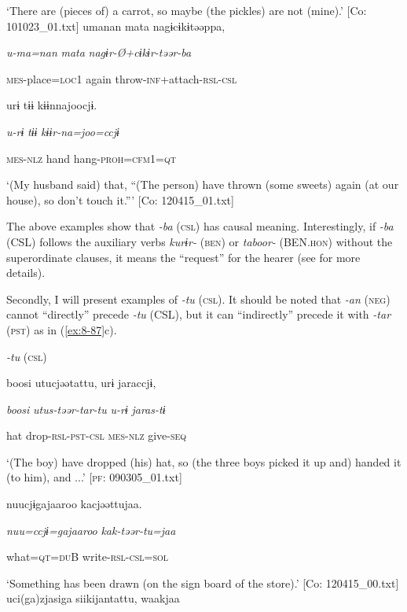 \glt ‘There are (pieces of) a carrot, so maybe (the pickles) are not (mine).’ [Co: 101023\_01.txt]
\ex {\TM}
\glll  umanan  mata  nagɨcɨkɨtəəppa,

      \textit{u-ma=nan}  \textit{mata}  \textit{nagɨr-Ø+cɨkɨr-təər-ba}

      \textsc{mes}-place=\textsc{loc}1  again  throw-\textsc{inf}+attach-\textsc{rsl}-\textsc{csl}

      urɨ  tɨɨ  kɨɨnnajoocjɨ.

      \textit{u-rɨ}  \textit{tɨɨ}  \textit{kɨɨr-na=joo=ccjɨ}

      \textsc{mes}-\textsc{nlz}  hand  hang-\textsc{proh}=\textsc{cfm1}=\textsc{qt}

\glt ‘(My husband said) that, “(The person) have thrown (some sweets) again (at our house), so don’t touch it.”’ [Co: 120415\_01.txt]
\z

The above examples show that \textit{{}-ba} (\textsc{csl}) has causal meaning. Interestingly, if \textit{{}-ba} (CSL) follows the auxiliary verbs \textit{kurɨr-} (\textsc{ben}) or \textit{taboor-} (BEN.\textsc{hon}) without the superordinate clauses, it means the “request” for the hearer (see  for more details).

  Secondly, I will present examples of \textit{{}-tu} (\textsc{csl}). It should be noted that \textit{-an} (\textsc{neg}) cannot “directly” precede \textit{{}-tu} (CSL), but it can “indirectly” precede it with \textit{{}-tar} (\textsc{pst}) as in (\ref{ex:8-87}c).

\ea\label{ex:8-87}
  \textit{{}-tu} (\textsc{csl})

\ea {\TM}
\glll  boosi  utucjəətattu,  urɨ  jaraccjɨ,

      \textit{boosi}  \textit{utus-təər-tar-tu}  \textit{u-rɨ}  \textit{jaras-tɨ}

      hat  drop-\textsc{rsl}-\textsc{pst}-\textsc{csl}  \textsc{mes}-\textsc{nlz}  give-\textsc{seq}

\glt ‘(The boy) have dropped (his) hat, so (the three boys picked it up and) handed it (to him), and ...’ [\textsc{pf}: 090305\_01.txt]
\ex [= (\ref{ex:5-39}b)]

    {\TM}
\glll  nuucjɨgajaaroo  kacjəəttujaa.

      \textit{nuu=ccjɨ=gajaaroo}  \textit{kak-təər-tu=jaa}

      what=\textsc{qt}=\textsc{du}B  write-\textsc{rsl}-\textsc{csl}=\textsc{sol}

\glt ‘Something has been drawn (on the sign board of the store).’ [Co: 120415\_00.txt]
\ex {\TM}
\glll  uci(ga)zjasiga  siikijantattu,  waakjaa

